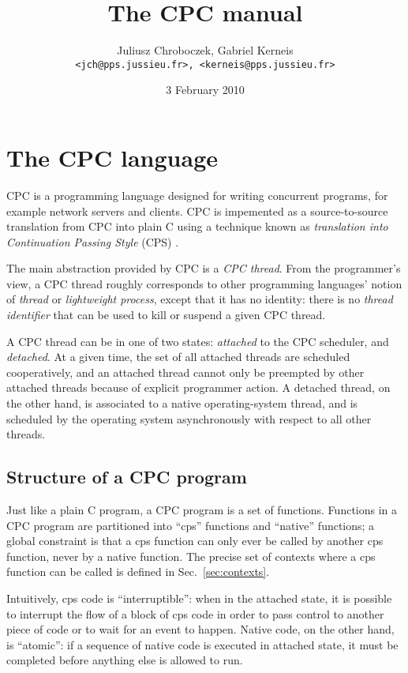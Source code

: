\documentclass[a4paper]{report}
\title{The CPC manual}
\author{Juliusz Chroboczek, Gabriel Kerneis\\
{\tt <jch@pps.jussieu.fr>, <kerneis@pps.jussieu.fr>}}
\date{3 February 2010}
\begin{document}
\maketitle

\chapter{The CPC language} \label{chapter:language}

CPC is a programming language designed for writing concurrent programs, for
example network servers and clients.  CPC is impemented as a
source-to-source translation from CPC into plain C using a technique known
as {\em translation into Continuation Passing Style\/} (CPS)
\cite{strachey:continuations, plotkin:call-by-lambda}.

The main abstraction provided by CPC is a {\em CPC thread}.  From the
programmer's view, a CPC thread roughly corresponds to other programming
languages' notion of {\em thread\/} or {\em lightweight process}, except
that it has no identity: there is no {\em thread identifier\/} that can be
used to kill or suspend a given CPC thread.

A CPC thread can be in one of two states: {\em attached\/} to the CPC
scheduler, and {\em detached}.  At a given time, the set of all attached
threads are scheduled cooperatively, and an attached thread cannot only be
preempted by other attached threads because of explicit programmer action.
A detached thread, on the other hand, is associated to a native
operating-system thread, and is scheduled by the operating system
asynchronously with respect to all other threads.

\section{Structure of a CPC program}

Just like a plain C program, a CPC program is a set of functions.
Functions in a CPC program are partitioned into ``cps'' functions and
``native'' functions; a global constraint is that a cps function can
only ever be called by another cps function, never by a native
function.  The precise set of contexts where a cps function can be
called is defined in Sec.~\ref{sec:contexts}.

Intuitively, cps code is ``interruptible'': when in the attached state, it
is possible to interrupt the flow of a block of cps code in order to pass
control to another piece of code or to wait for an event to happen.  Native
code, on the other hand, is ``atomic'': if a sequence of native code is
executed in attached state, it must be completed before anything else is
allowed to run.
\end{document}
